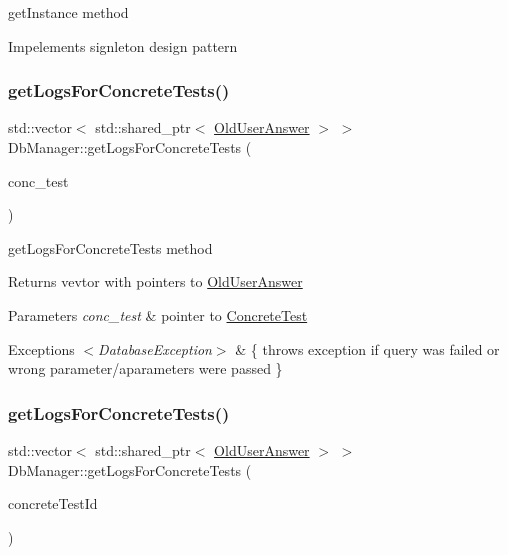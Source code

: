 get\+Instance method 

Impelements signleton design pattern \mbox{\label{class_db_manager_a491adbd809f1a74913f4eb1b6e4497c9}} 
\subsubsection{\texorpdfstring{get\+Logs\+For\+Concrete\+Tests()}{getLogsForConcreteTests()}\hspace{0.1cm}{\footnotesize\ttfamily [1/2]}}
{\footnotesize\ttfamily std\+::vector$<$ std\+::shared\+\_\+ptr$<$ \hyperlink{class_old_user_answer}{Old\+User\+Answer} $>$ $>$ Db\+Manager\+::get\+Logs\+For\+Concrete\+Tests (\begin{DoxyParamCaption}\item[{std\+::shared\+\_\+ptr$<$ \hyperlink{class_concrete_test}{Concrete\+Test} $>$}]{conc\+\_\+test }\end{DoxyParamCaption})}



get\+Logs\+For\+Concrete\+Tests method 

\begin{DoxyReturn}{Returns}
vevtor with pointers to \hyperlink{class_old_user_answer}{Old\+User\+Answer} 
\end{DoxyReturn}

\begin{DoxyParams}{Parameters}
{\em conc\+\_\+test} & pointer to \hyperlink{class_concrete_test}{Concrete\+Test} \\
\hline
\end{DoxyParams}

\begin{DoxyExceptions}{Exceptions}
{\em $<$\+Database\+Exception$>$} & \{ throws exception if query was failed or wrong parameter/aparameters were passed \} \\
\hline
\end{DoxyExceptions}
\mbox{\label{class_db_manager_af14965b28cc78d80bbf76bddf045e13c}} 
\subsubsection{\texorpdfstring{get\+Logs\+For\+Concrete\+Tests()}{getLogsForConcreteTests()}\hspace{0.1cm}{\footnotesize\ttfamily [2/2]}}
{\footnotesize\ttfamily std\+::vector$<$ std\+::shared\+\_\+ptr$<$ \hyperlink{class_old_user_answer}{Old\+User\+Answer} $>$ $>$ Db\+Manager\+::get\+Logs\+For\+Concrete\+Tests (\begin{DoxyParamCaption}\item[{unsigned int}]{concrete\+Test\+Id }\end{DoxyParamCaption})}



